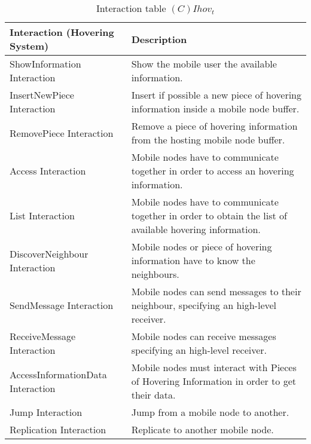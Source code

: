 \begin{table}[H]
	\centering
	\begin{tabular}{|p{4cm}|p{8cm}|}
			\hline
			\textbf{Interaction (Hovering System)} & \textbf{Description} \\
			\hline
			ShowInformation Interaction & Show the mobile user the available information. \\
			\hline
			InsertNewPiece Interaction & Insert if possible a new piece of hovering
			information inside a mobile node buffer. \\
			\hline
			RemovePiece Interaction & Remove a piece of hovering information from the
			hosting mobile node buffer. \\
			\hline
			Access Interaction & Mobile nodes have to communicate together in order to
			access an hovering information. \\
			\hline
			List Interaction & Mobile nodes have to communicate together in order to
			obtain the list of available hovering information. \\
			\hline
			DiscoverNeighbour Interaction & Mobile nodes or piece of hovering
			information have to know the neighbours. \\
			\hline
      SendMessage Interaction & Mobile nodes can send messages to their
      neighbour, specifying an high-level receiver. \\
			\hline
      ReceiveMessage Interaction & Mobile nodes can receive messages specifying
      an high-level receiver. \\
			\hline
			\hline
			AccessInformationData Interaction & Mobile nodes must interact with Pieces
			of Hovering Information in order to get their data. \\
			\hline
			Jump Interaction & Jump from a mobile node to another. \\
			\hline
			Replication Interaction & Replicate to another mobile node. \\
			\hline
		\end{tabular}
	\caption{Interaction table $(C)Ihov_t$}
	\label{tab:cihovt}
\end{table}

